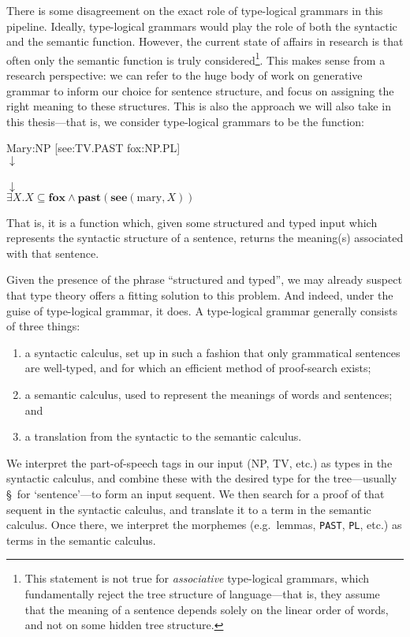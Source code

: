 There is some disagreement on the exact role of type-logical grammars in
this pipeline. Ideally, type-logical grammars would play the role of
both the syntactic and the semantic function. However, the current
state of affairs in research is that often only the semantic function
is truly considered\footnote{%
  This statement is not true for \emph{associative} type-logical
  grammars, which fundamentally reject the tree structure of
  language---that is, they assume that the meaning of a sentence
  depends solely on the linear order of words, and not on some hidden
  tree structure.
}. This makes sense from a research perspective: we can refer to the
huge body of work on generative grammar to inform our choice for
sentence structure, and focus on assigning the right meaning to these
structures. This is also the approach we will also take in this
thesis---that is, we consider type-logical grammars to be the
function:
\begin{center}
  Mary:NP [see:TV.PAST fox:NP.PL]\\
  $\downarrow$\\
  \\
  $\downarrow$\\
  $\exists X.X\subseteq\mathbf{fox}\land\mathbf{past}(\mathbf{see}(\text{mary},X))$
\end{center}
That is, it is a function which, given some structured and typed input
which represents the syntactic structure of a sentence, returns the
meaning(s) associated with that sentence.

Given the presence of the phrase ``structured and typed'', we may
already suspect that type theory offers a fitting solution to this
problem. And indeed, under the guise of type-logical grammar, it
does. A type-logical grammar generally consists of three things:
\begin{enumerate}[label=(\arabic*)]
\item a syntactic calculus, set up in such a fashion that only
  grammatical sentences are well-typed, and for which an efficient
  method of proof-search exists;
\item a semantic calculus, used to represent the meanings of words and
  sentences; and
\item a translation from the syntactic to the semantic calculus.
\end{enumerate}
We interpret the part-of-speech tags in our input (NP, TV, etc.) as
types in the syntactic calculus, and combine these with the desired
type for the tree---usually \S\ for `sentence'---to form an input
sequent.
We then search for a proof of that sequent in the syntactic calculus,
and translate it to a term in the semantic calculus.
Once there, we interpret the morphemes (e.g.\ lemmas, \texttt{PAST},
\texttt{PL}, etc.) as terms in the semantic calculus.

